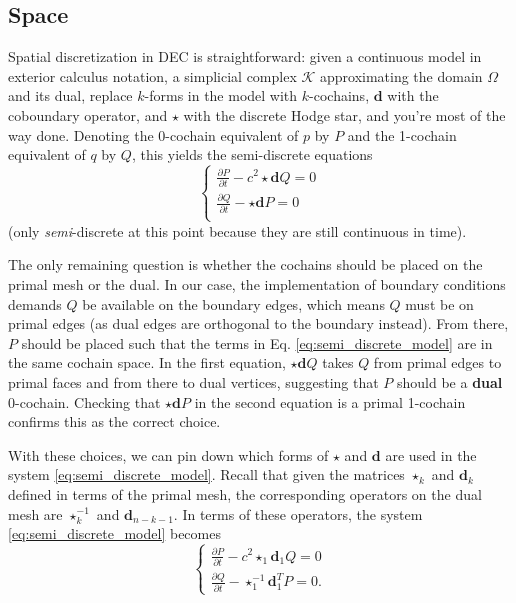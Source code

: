 \documentclass[utf8,english]{gradu3}
\begin{document}
\subsection{Space}

Spatial discretization in DEC is straightforward:
given a continuous model in exterior calculus notation,
a simplicial complex $\mathcal{K}$ approximating the domain $\Omega$ and its dual,
replace $k$-forms in the model with $k$-cochains,
$\mathbf{d}$ with the coboundary operator,
and $\star$ with the discrete Hodge star,
and you're most of the way done.
Denoting the 0-cochain equivalent of $p$ by $P$
and the 1-cochain equivalent of $q$ by $Q$,
this yields the semi-discrete equations
\begin{equation}\label{eq:semi_discrete_model}
  \begin{cases}
    \frac{\partial P}{\partial t} - c^2 \star \mathbf{d} Q = 0 \\
    \frac{\partial Q}{\partial t} - \star \mathbf{d} P = 0 \\
  \end{cases}
\end{equation}
(only \textit{semi}-discrete at this point
because they are still continuous in time).

The only remaining question is whether the cochains should be placed
on the primal mesh or the dual.
In our case, the implementation of boundary conditions demands $Q$
be available on the boundary edges, which means $Q$ must be on primal edges
(as dual edges are orthogonal to the boundary instead).
From there, $P$ should be placed such that the terms in Eq. \eqref{eq:semi_discrete_model}
are in the same cochain space.
In the first equation, $\star\mathbf{d}Q$
takes $Q$ from primal edges to primal faces and from there to dual vertices,
suggesting that $P$ should be a \textbf{dual} 0-cochain.
Checking that $\star \mathbf{d} P$ in the second equation
is a primal 1-cochain confirms this as the correct choice.

With these choices, we can pin down which forms of $\star$ and $\mathbf{d}$
are used in the system \eqref{eq:semi_discrete_model}.
Recall that given the matrices $\star_k$ and $\mathbf{d}_k$
defined in terms of the primal mesh,
the corresponding operators on the dual mesh are
$\star_k^{-1}$ and $\mathbf{d}_{n-k-1}$.
In terms of these operators, the system \eqref{eq:semi_discrete_model} becomes
\begin{equation}\label{eq:semi_discrete_model_annotated}
  \begin{cases}
    \frac{\partial P}{\partial t} - c^2 \star_1 \mathbf{d}_1 Q = 0 \\
    \frac{\partial Q}{\partial t} - \star_1^{-1} \mathbf{d}_1^T P = 0.
  \end{cases}
\end{equation}
\end{document}
